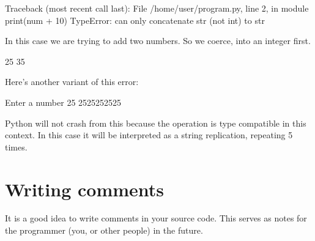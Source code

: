\documentclass[letterpaper,10pt,english]{jupyterBook}
\begin{document}
\begin{sphinxVerbatim}[commandchars=\\\{\}]
Traceback (most recent call last):
  File \PYGZdq{}/home/user/program.py\PYGZdq{}, line 2, in \PYGZlt{}module\PYGZgt{}
    print(num + 10)
          \PYGZti{}\PYGZti{}\PYGZti{}\PYGZti{}\PYGZca{}\PYGZti{}\PYGZti{}\PYGZti{}
TypeError: can only concatenate str (not \PYGZdq{}int\PYGZdq{}) to str
\end{sphinxVerbatim}

\sphinxAtStartPar
In this case we are trying to add two numbers. So we coerce,  into an integer first.

\begin{sphinxVerbatim}[commandchars=\\\{\}]
  
  
  
\end{sphinxVerbatim}

\begin{sphinxVerbatim}[commandchars=\\\{\}]
25
35
\end{sphinxVerbatim}

\sphinxAtStartPar
Here’s another variant of this error:

\begin{sphinxVerbatim}[commandchars=\\\{\}]
  
  
\end{sphinxVerbatim}

\begin{sphinxVerbatim}[commandchars=\\\{\}]
Enter a number
25
2525252525
\end{sphinxVerbatim}

\sphinxAtStartPar
Python will not crash from this because the \sphinxcode{\sphinxupquote{*}} operation is type compatible in this context. In this case it will be interpreted as a string replication, repeating  5 times.


\section{Writing comments}
\label{\detokenize{first-program:writing-comments}}
\sphinxAtStartPar
It is a good idea to write comments in your source code.
This serves as notes for the programmer (you, or other people) in the future.
\end{document}
